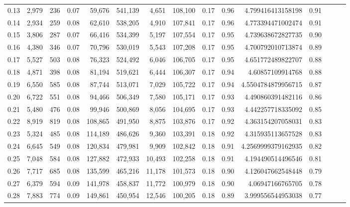 \begin{tabular}{rrrrrrrrrrrrrrr}
0.13 &   2,979 &    236 &  0.07 &   59,676 &  541,139 &    4,651 &  108,100 &  0.17 &  0.96 &     4.799416413158198 &      0.91 \\
0.14 &   2,934 &    259 &  0.08 &   62,610 &  538,205 &    4,910 &  107,841 &  0.17 &  0.96 &     4.773394471002474 &      0.91 \\
0.15 &   3,806 &    287 &  0.07 &   66,416 &  534,399 &    5,197 &  107,554 &  0.17 &  0.95 &     4.739638672827735 &      0.90 \\
0.16 &   4,380 &    346 &  0.07 &   70,796 &  530,019 &    5,543 &  107,208 &  0.17 &  0.95 &     4.700792010713874 &      0.89 \\
0.17 &   5,527 &    503 &  0.08 &   76,323 &  524,492 &    6,046 &  106,705 &  0.17 &  0.95 &     4.651772489822707 &      0.88 \\
0.18 &   4,871 &    398 &  0.08 &   81,194 &  519,621 &    6,444 &  106,307 &  0.17 &  0.94 &      4.60857109914768 &      0.88 \\
0.19 &   6,550 &    585 &  0.08 &   87,744 &  513,071 &    7,029 &  105,722 &  0.17 &  0.94 &    4.5504784879956715 &      0.87 \\
0.20 &   6,722 &    551 &  0.08 &   94,466 &  506,349 &    7,580 &  105,171 &  0.17 &  0.93 &     4.490860391482116 &      0.86 \\
0.21 &   5,480 &    476 &  0.08 &   99,946 &  500,869 &    8,056 &  104,695 &  0.17 &  0.93 &     4.442257718335092 &      0.85 \\
0.22 &   8,919 &    819 &  0.08 &  108,865 &  491,950 &    8,875 &  103,876 &  0.17 &  0.92 &     4.363154207058031 &      0.83 \\
0.23 &   5,324 &    485 &  0.08 &  114,189 &  486,626 &    9,360 &  103,391 &  0.18 &  0.92 &     4.315935113657528 &      0.83 \\
0.24 &   6,645 &    549 &  0.08 &  120,834 &  479,981 &    9,909 &  102,842 &  0.18 &  0.91 &    4.2569999379162935 &      0.82 \\
0.25 &   7,048 &    584 &  0.08 &  127,882 &  472,933 &   10,493 &  102,258 &  0.18 &  0.91 &     4.194490514496546 &      0.81 \\
0.26 &   7,717 &    685 &  0.08 &  135,599 &  465,216 &   11,178 &  101,573 &  0.18 &  0.90 &     4.126047662548448 &      0.79 \\
0.27 &   6,379 &    594 &  0.09 &  141,978 &  458,837 &   11,772 &  100,979 &  0.18 &  0.90 &      4.06947166765705 &      0.78 \\
0.28 &   7,883 &    774 &  0.09 &  149,861 &  450,954 &   12,546 &  100,205 &  0.18 &  0.89 &     3.999556544953038 &      0.77 \\

\end{tabular}
